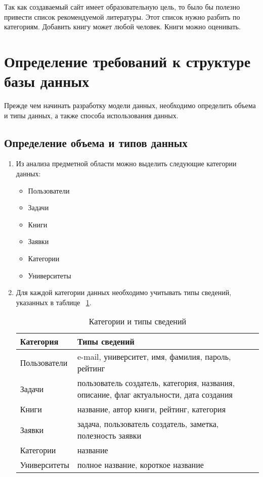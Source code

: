 Так как создаваемый сайт имеет образовательную цель, то было бы полезно привести список рекомендуемой литературы. Этот список нужно разбить по категориям. Добавить книгу может любой человек. Книги можно оценивать.

\section{Определение требований к структуре базы данных}
Прежде чем начинать разработку модели данных, необходимо определить объема и типы данных, а также способа использования данных.
 
\subsection{Определение объема и типов данных }
\begin{enumerate}
\item Из анализа предметной области можно выделить следующие категории данных:
	\begin{itemize}
	\item Пользователи
	\item Задачи
	\item Книги
	\item Заявки
	\item Категории
	\item Университеты
	\end{itemize}


\item Для каждой категории данных необходимо учитывать типы сведений, указанных в таблице ~\ref{table:cat-and-type}.

\begin{table}[h]
\caption{Категории и типы сведений}\label{table:cat-and-type}
\medskip
\begin{tabular}{|l|p{12cm}|}
\hline
Категория & Типы сведений\\
\hline
Пользователи &  e-mail, университет, имя, фамилия, пароль, рейтинг\\
Задачи & пользователь создатель, категория, названия, описание, флаг актуальности, дата создания  \\
Книги & название, автор книги, рейтинг, категория \\
Заявки & задача, пользователь создатель, заметка, полезность заявки \\
Категории & название \\
Университеты & полное название, короткое название \\
\hline
\end{tabular}
\end{table}

\end{enumerate}

